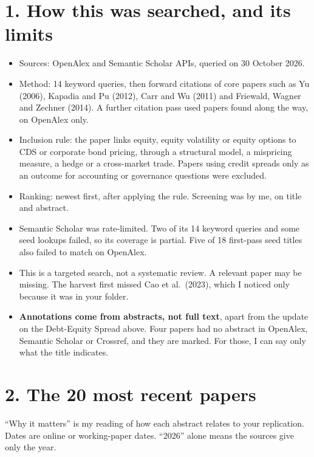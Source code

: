 \documentclass[10pt,a4paper]{article}
\begin{document}
\section*{1. How this was searched, and its limits}
\begin{itemize}[leftmargin=*,itemsep=1pt]
\item Sources: OpenAlex and Semantic Scholar APIs, queried on 30 October 2026.
\item Method: 14 keyword queries, then forward citations of core papers such as Yu (2006), Kapadia and Pu (2012), Carr and Wu (2011) and Friewald, Wagner and Zechner (2014). A further citation pass used papers found along the way, on OpenAlex only.
\item Inclusion rule: the paper links equity, equity volatility or equity options to CDS or corporate bond pricing, through a structural model, a mispricing measure, a hedge or a cross-market trade. Papers using credit spreads only as an outcome for accounting or governance questions were excluded.
\item Ranking: newest first, after applying the rule. Screening was by me, on title and abstract.
\item Semantic Scholar was rate-limited. Two of its 14 keyword queries and some seed lookups failed, so its coverage is partial. Five of 18 first-pass seed titles also failed to match on OpenAlex.
\item This is a targeted search, not a systematic review. A relevant paper may be missing. The harvest first missed Cao et al.\ (2023), which I noticed only because it was in your folder.
\item \textbf{Annotations come from abstracts, not full text}, apart from the update on the Debt-Equity Spread above. Four papers had no abstract in OpenAlex, Semantic Scholar or Crossref, and they are marked. For those, I can say only what the title indicates.
\end{itemize}

\section*{2. The 20 most recent papers}
``Why it matters'' is my reading of how each abstract relates to your replication. Dates are online or working-paper dates. ``2026'' alone means the sources give only the year.
\end{document}
